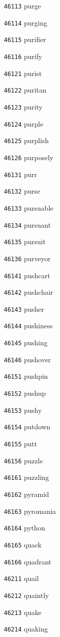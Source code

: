 \documentclass[twoside,11pt]{article}
\begin{document}
\begin{multicols}{5}
\begin{enumerate}
\item[\texttt{46113}] purge
\item[\texttt{46114}] purging
\item[\texttt{46115}] purifier
\item[\texttt{46116}] purify
\item[\texttt{46121}] purist
\item[\texttt{46122}] puritan
\item[\texttt{46123}] purity
\item[\texttt{46124}] purple
\item[\texttt{46125}] purplish
\item[\texttt{46126}] purposely
\item[\texttt{46131}] purr
\item[\texttt{46132}] purse
\item[\texttt{46133}] pursuable
\item[\texttt{46134}] pursuant
\item[\texttt{46135}] pursuit
\item[\texttt{46136}] purveyor
\item[\texttt{46141}] pushcart
\item[\texttt{46142}] pushchair
\item[\texttt{46143}] pusher
\item[\texttt{46144}] pushiness
\item[\texttt{46145}] pushing
\item[\texttt{46146}] pushover
\item[\texttt{46151}] pushpin
\item[\texttt{46152}] pushup
\item[\texttt{46153}] pushy
\item[\texttt{46154}] putdown
\item[\texttt{46155}] putt
\item[\texttt{46156}] puzzle
\item[\texttt{46161}] puzzling
\item[\texttt{46162}] pyramid
\item[\texttt{46163}] pyromania
\item[\texttt{46164}] python
\item[\texttt{46165}] quack
\item[\texttt{46166}] quadrant
\item[\texttt{46211}] quail
\item[\texttt{46212}] quaintly
\item[\texttt{46213}] quake
\item[\texttt{46214}] quaking

\end{enumerate}
\end{multicols}
\end{document}
